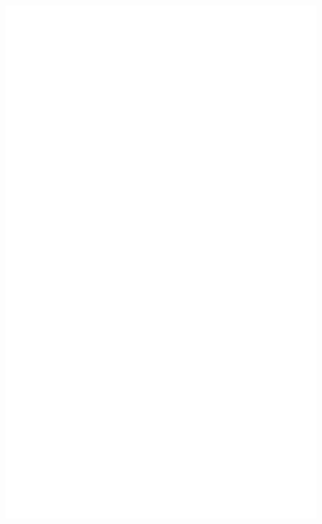 \documentclass[12pt]{article}
\begin{document}
\newpage

\pagecolor{blueColor}

\begin{titlepage}
    \centering

     \includegraphics[width=0.88\textwidth, keepaspectratio]{latex-cover.png}
    
\end{titlepage}

\newpage

\pagecolor{white}

\renewenvironment{abstract}
 {\small
  \begin{center}
  \bfseries \abstractname\vspace{-.5em}\vspace{0pt}
  \end{center}
  \list{}{
    \setlength{\leftmargin}{.5cm}
    \setlength{\rightmargin}{\leftmargin}
  }
  \item\relax}
 {\endlist}
 
\end{document}
